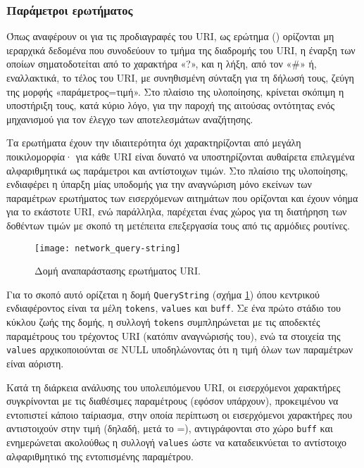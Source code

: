 \subsubsection{Παράμετροι ερωτήματος}
\label{ssubsec:network:query-string}

Όπως αναφέρουν οι \textcite[23--24]{rfc3986} για τις προδιαγραφές του URI, ως
ερώτημα () ορίζονται μη ιεραρχικά δεδομένα που συνοδεύουν το τμήμα της
διαδρομής του URI, η έναρξη των οποίων σηματοδοτείται από το χαρακτήρα «?», και
η λήξη, από τον «\#» ή, εναλλακτικά, το τέλος του URI, με συνηθισμένη σύνταξη
για τη δήλωσή τους, ζεύγη της μορφής «παράμετρος=τιμή». Στο πλαίσιο της
υλοποίησης, κρίνεται σκόπιμη η υποστήριξη τους, κατά κύριο λόγο, για την παροχή
της αιτούσας οντότητας ενός μηχανισμού για τον έλεγχο των αποτελεσμάτων
αναζήτησης.

Τα ερωτήματα έχουν την ιδιαιτερότητα όχι χαρακτηρίζονται από μεγάλη
ποικιλομορφία· για κάθε URI είναι δυνατό να υποστηρίζονται αυθαίρετα επιλεγμένα
αλφαριθμητικά ως παράμετροι και αντίστοιχων τιμών. Στο πλαίσιο της υλοποίησης,
ενδιαφέρει η ύπαρξη μίας υποδομής για την αναγνώριση μόνο εκείνων των παραμέτρων
ερωτήματος των εισερχόμενων αιτημάτων που ορίζονται και έχουν νόημα για το
εκάστοτε URI, ενώ παράλληλα, παρέχεται ένας χώρος για τη διατήρηση των δοθέντων
τιμών με σκοπό τη μετέπειτα επεξεργασία τους από τις αρμόδιες ρουτίνες.

\begin{figure}
    \caption{Δομή αναπαράστασης ερωτήματος URI.
    \label{fig:network:query-string}}
    \begin{center}
    \texttt{[image: network\_query-string]}
    \end{center}
\end{figure}

Για το σκοπό αυτό ορίζεται η δομή \verb~QueryString~ (σχήμα
\ref{fig:network:query-string}) όπου κεντρικού ενδιαφέροντος είναι τα μέλη
\verb~tokens~, \verb~values~ και \verb~buff~. Σε ένα πρώτο στάδιο του κύκλου
ζωής της δομής, η συλλογή \verb~tokens~ συμπληρώνεται με τις αποδεκτές
παραμέτρους του τρέχοντος URI (κατόπιν αναγνώρισής του), ενώ τα στοιχεία της
\verb~values~ αρχικοποιούνται σε NULL υποδηλώνοντας ότι η τιμή όλων των
παραμέτρων είναι αόριστη.

Κατά τη διάρκεια ανάλυσης του υπολειπόμενου URI, οι εισερχόμενοι χαρακτήρες
συγκρίνονται με τις διαθέσιμες παραμέτρους (εφόσον υπάρχουν), προκειμένου να
εντοπιστεί κάποιο ταίριασμα, στην οποία περίπτωση οι εισερχόμενοι χαρακτήρες που
αντιστοιχούν στην τιμή (δηλαδή, μετά το =), αντιγράφονται στο χώρο \verb~buff~
και ενημερώνεται ακολούθως η συλλογή \verb~values~ ώστε να καταδεικνύεται το
αντίστοιχο αλφαριθμητικό της εντοπισμένης παραμέτρου.

